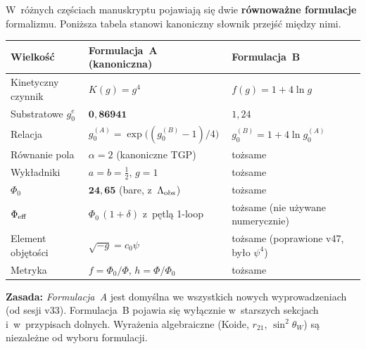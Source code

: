 \begin{remark}%
\label{rem:formulation-dictionary}
W~r\'o\.znych cz\k{e}\'sciach manuskryptu pojawiaj\k{a} si\k{e} dwie
\textbf{r\'ownowa\.zne formulacje} formalizmu. Poni\.zsza tabela
stanowi kanoniczny s\l{}ownik przej\'s\'c mi\k{e}dzy nimi.

\begin{center}\footnotesize
\begin{tabular}{@{}p{3cm}p{4.5cm}p{4.5cm}@{}}
\toprule
\textbf{Wielko\'s\'c} & \textbf{Formulacja~A} (kanoniczna)
  & \textbf{Formulacja~B} \\
\midrule
Kinetyczny czynnik & $K(g) = g^4$ & $f(g) = 1 + 4\ln g$ \\
Substratowe $g_0^e$ & $\mathbf{0{,}86941}$ & $1{,}24$ \\
Relacja & $g_0^{(A)} = \exp\!\bigl((g_0^{(B)} - 1)/4\bigr)$ &
  $g_0^{(B)} = 1 + 4\ln g_0^{(A)}$ \\
\midrule
R\'ownanie pola & $\alpha = 2$ (kanoniczne TGP) & to\.zsame \\
Wyk\l{}adniki & $a = b = \tfrac12$, $g = 1$ & to\.zsame \\
$\Phi_0$ & $\mathbf{24{,}65}$ (bare, z~$\Lambda_{\rm obs}$) & to\.zsame \\
$\Phi_{\rm eff}$ & $\Phi_0\,(1+\delta)$ z~p\k{e}tl\k{a} 1-loop
  & to\.zsame (nie u\.zywane numerycznie) \\
\midrule
Element obj\k{e}to\'sci & $\sqrt{-g} = c_0\psi$
  & to\.zsame (poprawione v47, by\l{}o $\psi^4$) \\
Metryka & $f = \Phi_0/\Phi$, $h = \Phi/\Phi_0$
  & to\.zsame \\
\bottomrule
\end{tabular}
\end{center}

\medskip\noindent
\textbf{Zasada:} \textit{Formulacja~A} jest domy\'slna we wszystkich
nowych wyprowadzeniach (od sesji v33).
Formulacja~B pojawia si\k{e} wy\l{}\k{a}cznie w~starszych sekcjach
i~w~przypisach dolnych.
Wyra\.zenia algebraiczne (Koide, $r_{21}$, $\sin^2\theta_W$)
s\k{a} niezale\.zne od wyboru formulacji.
\end{remark}


